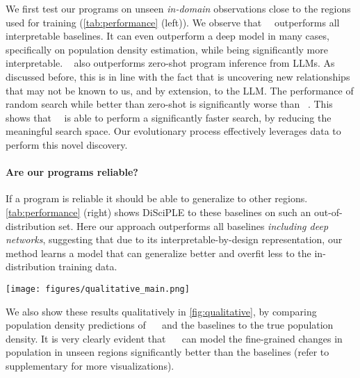 We first test our programs on unseen \emph{in-domain} observations close to the regions used for training (\cref{tab:performance} (left)).
We observe that ~\disciple~outperforms all interpretable baselines.
It can even outperform a deep model in many cases, specifically on population density estimation, while being significantly more interpretable.
\disciple~ also outperforms zero-shot program inference from LLMs.
As discussed before, this is in line with the fact that \disciple is uncovering new relationships that may not be known to us, and by extension, to the LLM.
The performance of random search while better than zero-shot is significantly worse than ~\disciple. 
This shows that~\disciple~ is able to perform a significantly faster search, by reducing the meaningful search space.
Our evolutionary process effectively leverages data to perform this novel discovery.

\paragraph{Are our programs reliable?} 
If a program is reliable it should be able to generalize to other regions. 
\cref{tab:performance} (right) shows DiSciPLE to these baselines on such an out-of-distribution set.
Here our approach outperforms all baselines \emph{including deep networks}, suggesting that due to its interpretable-by-design representation, our method learns a model that can generalize better and overfit less to the in-distribution training data.

\begin{figure*}[ht]
    \centering
\texttt{[image: figures/qualitative\_main.png]}
\caption{Qualitative comparison of ~\disciple~ with other baselines on the tasks of population density. ~\disciple~ Can map to the true population density maps much more accurately than the baselines (Refer to the supplementary for more comparisons). The maps display population density as the base-10 log of people per square mile.
}
\label{fig:qualitative}
\end{figure*}

We also show these results qualitatively in \cref{fig:qualitative}, by comparing population density predictions of ~\disciple~ and the baselines to the true population density.
It is very clearly evident that ~\disciple~ can model the fine-grained changes in population in unseen regions significantly better than the baselines (refer to supplementary for more visualizations). 


